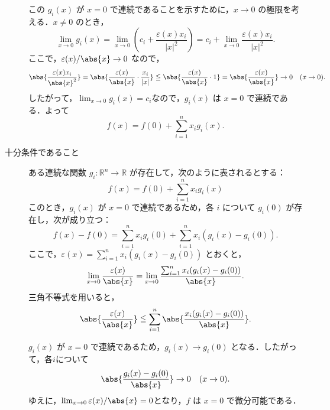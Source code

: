 \begin{tproof}
\begin{description}
          この $ g_i(x) $ が $ x=0 $ で連続であることを示すために，$ x \to 0 $ の極限を考える．$ x \ne 0 $ のとき，
          \[
            \lim_{x \to 0} g_i(x) = \lim_{x \to 0} \left( c_i + \frac{\varepsilon(x) x_i}{|x|^2} \right) = c_i + \lim_{x \to 0} \frac{\varepsilon(x) x_i}{|x|^2}.
          \]
          ここで，$\varepsilon(x)/\abs{x} \to 0 $ なので，
          \[
            \abs{\frac{\varepsilon(x) x_i}{\abs{x}^2}} = \abs{\frac{\varepsilon(x)}{\abs{x}} \cdot \frac{x_i}{|x|}} \leqq  \abs{\frac{\varepsilon(x)}{\abs{x}} \cdot 1} = \abs{\frac{\varepsilon(x)}{\abs{x}}} \to 0 \quad (x \to 0).
          \]
          したがって，$\lim_{x \to 0} g_i(x) = c_i$なので，$ g_i(x) $ は $ x=0 $ で連続である．よって
          \[
            f(x) = f(0) + \sum_{i=1}^n x_i g_i(x).
          \]
    \item [十分条件であること]
          ある連続な関数 $ g_i \colon \mathbb{R}^n \to \mathbb{R} $ が存在して，次のように表されるとする：
          \[
            f(x) = f(0) + \sum_{i=1}^n x_i g_i(x)
          \]
          このとき，$ g_i(x) $ が $ x=0 $ で連続であるため，各 $ i $ について $ g_i(0) $ が存在し，次が成り立つ：
          \[
            f(x) - f(0) = \sum_{i=1}^n x_i g_i(0) + \sum_{i=1}^n x_i (g_i(x) - g_i(0)).
          \]
          ここで，$ \varepsilon(x) = \sum_{i=1}^n x_i (g_i(x) - g_i(0)) $ とおくと，
          \[
            \lim_{x \to 0} \frac{\varepsilon(x)}{\abs{x}} = \lim_{x \to 0} \frac{\sum_{i=1}^n x_i (g_i(x) - g_i(0))}{\abs{x}}.
          \]
          三角不等式を用いると，
          \[
            \abs{ \frac{\varepsilon(x)}{\abs{x}} } \leqq \sum_{i=1}^n \abs{ \frac{x_i(g_i(x) - g_i(0))}{\abs{x}} }.
          \]

          $ g_i(x) $ が $ x=0 $ で連続であるため，$ g_i(x) \to g_i(0) $ となる．したがって，各$ i $について
          \[
            \abs{ \frac{g_i(x) - g_i(0)}{\abs{x}} } \to 0 \quad (x \to 0).
          \]
          ゆえに，$\lim_{x \to 0} \varepsilon(x)/\abs{x} = 0$となり，$ f $ は $ x=0 $ で微分可能である．
  \end{description}
\end{tproof}



